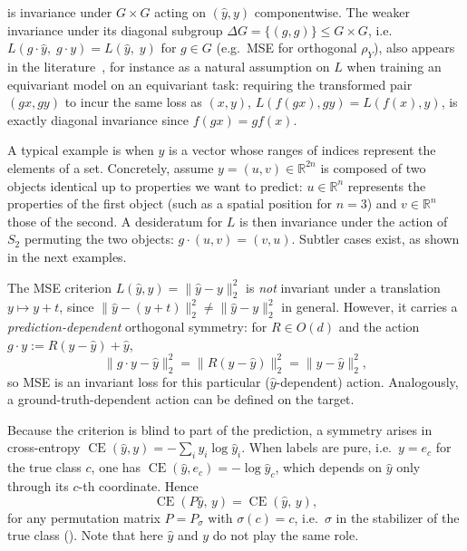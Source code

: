 \documentclass[mathematics,review,submit,moreauthors]{Definitions/mdpi}
\begin{document}
\begin{Remark}
     is invariance under $G\times G$ acting on $(\hat y,y)$ componentwise. The weaker invariance under its diagonal subgroup $\Delta G=\{(g,g)\}\le G\times G$, i.e.\ $L(g\cdot\hat y,\; g\cdot y)=L(\hat y,\; y)$ for $g\in G$ (e.g.\ MSE for orthogonal $\rho_Y$), also appears in the literature~\citep{nordenfors2024,lawrence2026,shen2026}, for instance as a natural assumption on $L$ when training an equivariant model on an equivariant task: requiring the transformed pair $(gx,gy)$ to incur the same loss as $(x,y)$, $L(f(gx),gy)=L(f(x),y)$, is exactly diagonal invariance since $f(gx)=gf(x)$.
\end{Remark}

A typical example is when $y$ is a vector whose ranges of indices represent the elements of a set.
Concretely, assume $y=(u,v)\in \mathbb R^{2n}$ is composed of two objects identical up to properties we want to predict: $u\in\mathbb{R}^n$ represents the properties of the first object (such as a spatial position for $n=3$) and $v\in\mathbb{R}^n$ those of the second.
A desideratum for $L$ is then invariance under the action of $S_2$ permuting the two objects: $g\cdot(u,v)=(v,u)$.
Subtler cases exist, as shown in the next examples.

\begin{Example}
    The MSE criterion $L(\hat y,y)=\|\hat y-y\|_2^2$ is \emph{not} invariant under a translation $y\mapsto y+t$, since $\|\hat y-(y+t)\|_2^2\neq\|\hat y-y\|_2^2$ in general.
    However, it carries a \emph{prediction-dependent} orthogonal symmetry: for $R\in O(d)$ and the action $g\cdot y:=R(y-\hat y)+\hat y$,
    $$
    \|g\cdot y-\hat y\|_2^2 = \|R(y-\hat y)\|_2^2 = \|y-\hat y\|_2^2,
    $$
    so MSE is an invariant loss for this particular ($\hat y$-dependent) action.
    Analogously, a ground-truth-dependent action can be defined on the target.
\end{Example}

\begin{Example}\label{ex:false-class-symmetries}
    Because the criterion is blind to part of the prediction, a symmetry arises in cross-entropy $\operatorname{CE}(\hat y, y)=-\sum_i y_i\log\hat y_i$.
    When labels are pure, i.e.\ $y=e_c$ for the true class $c$, one has $\operatorname{CE}(\hat y,e_c)=-\log \hat y_c$, which depends on $\hat y$ only through its $c$-th coordinate.
    Hence
    \begin{equation*}
        \operatorname{CE}(P\hat y,\, y)=\operatorname{CE}(\hat y,\, y),
    \end{equation*}
    for any permutation matrix $P=P_\sigma$ with $\sigma(c)=c$, i.e.\ $\sigma$ in the stabilizer of the true class ().
    Note that here $\hat y$ and $y$ do not play the same role.
\end{Example}
\end{document}

